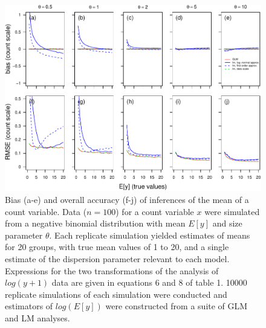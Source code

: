 \documentclass[]{article}
\begin{document}
\begin{figure}[h]

{\centering \includegraphics{revisiting_count_data_advice_files/figure-latex/SupplementAbsoluteScale-1} 

}

\caption{Bias (a-e) and overall accuracy (f-j) of inferences of the mean of a count variable.  Data ($n=100$) for a count variable $x$ were simulated from a negative binomial distribution with mean $E[y]$ and size parameter $\theta$.  Each replicate simulation yielded estimates of means for 20 groups, with true mean values of 1 to 20, and a single estimate of the dispersion parameter relevant to each model.  Expressions for the two transformations of the analysis of $log(y+1)$ data are given in equations 6 and 8 of table 1. 10000 replicate simulations of each simulation were conducted and estimators of $log(E[y])$ were constructed from a suite of GLM and LM analyses.}\label{fig:SupplementAbsoluteScale}
\end{figure}
\end{document}

